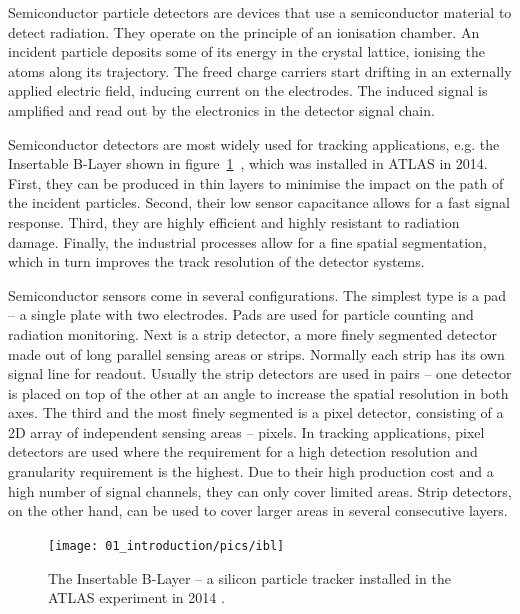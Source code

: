 Semiconductor particle detectors are devices that use a semiconductor material to detect radiation. They operate on the principle of an ionisation chamber. An incident particle deposits some of its energy in the crystal lattice, ionising the atoms along its trajectory. 
The freed charge carriers start drifting in an externally applied electric field, inducing current on the electrodes. The induced signal is amplified and read out by the electronics in the detector signal chain.

Semiconductor detectors are most widely used for tracking applications, e.g. the Insertable B-Layer shown in figure~\ref{fig:ibl}~\cite{Pernegger:1985432}, which was installed in ATLAS in 2014. First, they can be produced in thin layers to minimise the impact on the path of the incident particles. Second, their low sensor capacitance allows for a fast signal response. Third, they are highly efficient and highly resistant to radiation damage. Finally, the industrial processes allow for a fine spatial segmentation, which in turn improves the track resolution of the detector systems. 

Semiconductor sensors come in several configurations. The simplest type is a pad -- a single plate with two electrodes. Pads are used for particle counting and radiation monitoring. Next is a strip detector, a more finely segmented detector made out of long parallel sensing areas or strips. Normally each strip has its own signal line for readout. Usually the strip detectors are used in pairs -- one detector is placed on top of the other at an angle to increase the spatial resolution in both axes. The third and the most finely segmented is a pixel detector, consisting of a 2D array of independent sensing areas -- pixels. In tracking applications, pixel detectors are used where the requirement for a high detection resolution and granularity requirement is the highest. Due to their high production cost and a high number of signal channels, they can only cover limited areas. Strip detectors, on the other hand, can be used to cover larger areas in several consecutive layers.

\begin{figure}[!t]
\centering
\texttt{[image: 01\_introduction/pics/ibl]}
\caption{The Insertable B-Layer -- a silicon particle tracker installed in the ATLAS experiment in 2014 \cite{MarcelloniDeOliveira:1702006}.}
\label{fig:ibl}
\end{figure}





